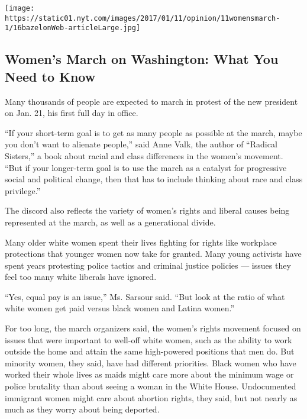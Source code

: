\href{https://www.nytimes.com/interactive/2017/01/10/us/politics/womens-march-guide.html}{}

\texttt{[image: https://static01.nyt.com/images/2017/01/11/opinion/11womensmarch-1/16bazelonWeb-articleLarge.jpg]}

\hypertarget{womens-march-on-washington-what-you-need-to-know}{%
\subsection{Women's March on Washington: What You Need to
Know}\label{womens-march-on-washington-what-you-need-to-know}}

Many thousands of people are expected to march in protest of the new
president on Jan. 21, his first full day in office.

``If your short-term goal is to get as many people as possible at the
march, maybe you don't want to alienate people,'' said Anne Valk, the
author of ``Radical Sisters,'' a book about racial and class differences
in the women's movement. ``But if your longer-term goal is to use the
march as a catalyst for progressive social and political change, then
that has to include thinking about race and class privilege.''

The discord also reflects the variety of women's rights and liberal
causes being represented at the march, as well as a generational divide.

Many older white women spent their lives fighting for rights like
workplace protections that younger women now take for granted. Many
young activists have spent years protesting police tactics and criminal
justice policies --- issues they feel too many white liberals have
ignored.

``Yes, equal pay is an issue,'' Ms. Sarsour said. ``But look at the
ratio of what white women get paid versus black women and Latina
women.''

For too long, the march organizers said, the women's rights movement
focused on issues that were important to well-off white women, such as
the ability to work outside the home and attain the same high-powered
positions that men do. But minority women, they said, have had different
priorities. Black women who have worked their whole lives as maids might
care more about the minimum wage or police brutality than about seeing a
woman in the White House. Undocumented immigrant women might care about
abortion rights, they said, but not nearly as much as they worry about
being deported.

